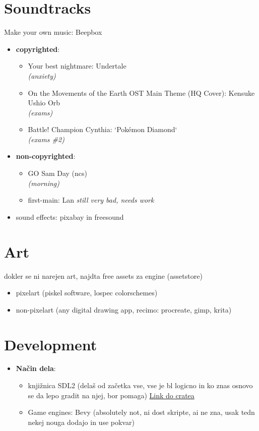 \documentclass[a4paper]{article}
\begin{document}
\section{Soundtracks}
Make your own music: Beepbox
\begin{itemize}
    \item \textbf{copyrighted}: \begin{itemize}
        \item Your best nightmare: Undertale \\
        \textsl{(anxiety)}
        \item On the Movements of the Earth OST \- Main Theme (HQ Cover): Kensuke Ushio Orb \\
        \textsl{(exams)}
        \item Battle! Champion Cynthia: `Pokémon Diamond`\\
        \textsl{(exams \#2)}
    \end{itemize}
    
    \item \textbf{non-copyrighted}: \begin{itemize}
        \item GO\: Sam Day (ncs) \\
        \textsl{(morning)}
        \item first-main: Lan
        \textsl{still very bad, needs work}
    \end{itemize}
    \item sound effects: pixabay in freesound
\end{itemize}

\section{Art}
dokler se ni narejen art, najdta free assets za engine (assetstore)
\begin{itemize}
    \item pixelart (piskel \- software, lospec \- colorschemes)
    \item non-pixelart (any digital drawing app, recimo: procreate, gimp, krita)
\end{itemize}

\section{Development}
\begin{itemize}
    \item \textbf{Način dela}: \begin{itemize}
        \item knjižnica SDL2 (delaš od začetka vse, vse je bl logicno in ko znas osnovo se da lepo gradit na njej, bor pomaga) \href{https://crates.io/crates/sdl1_2-rs}{Link do cratea}
        \item Game engines: Bevy (absolutely not, ni dost skripte, ai ne zna, usak tedn nekej nouga dodajo in use pokvar)
    \end{itemize}
\end{itemize}
\end{document}
